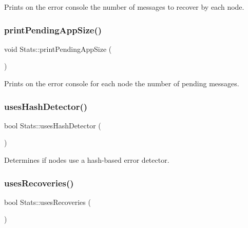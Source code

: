 Prints on the error console the number of messages to recover by each node. 

\mbox{\label{class_stats_a5b65312e84788b3fe5e19c8e535a03f4}} 
\subsubsection{\texorpdfstring{print\+Pending\+App\+Size()}{printPendingAppSize()}}
{\footnotesize\ttfamily void Stats\+::print\+Pending\+App\+Size (\begin{DoxyParamCaption}{ }\end{DoxyParamCaption})\hspace{0.3cm}{\ttfamily [private]}}



Prints on the error console for each node the number of pending messages. 

\mbox{\label{class_stats_a509d8e8fba4312eeffe2c6cee722f30f}} 
\subsubsection{\texorpdfstring{uses\+Hash\+Detector()}{usesHashDetector()}}
{\footnotesize\ttfamily bool Stats\+::uses\+Hash\+Detector (\begin{DoxyParamCaption}{ }\end{DoxyParamCaption})\hspace{0.3cm}{\ttfamily [private]}}



Determines if nodes use a hash-\/based error detector. 

\mbox{\label{class_stats_a876b1b2674fb82cb45b6bc4b094019ae}} 
\subsubsection{\texorpdfstring{uses\+Recoveries()}{usesRecoveries()}}
{\footnotesize\ttfamily bool Stats\+::uses\+Recoveries (\begin{DoxyParamCaption}{ }\end{DoxyParamCaption})\hspace{0.3cm}{\ttfamily [private]}}



